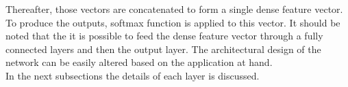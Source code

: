 Thereafter, those vectors are concatenated to form a single dense feature vector. To produce the outputs, softmax function is applied to this vector. It should be noted that the it is possible to feed the dense feature vector through a fully connected layers and then the output layer. The architectural design of the network can be easily altered based on the application at hand.\\
In the next subsections the details of each layer is discussed.  

